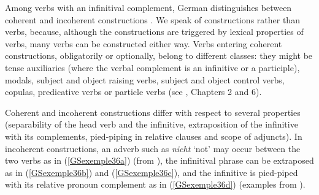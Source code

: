 {Among verbs with an infinitival complement, German distinguishes between coherent and incoherent constructions \citep{gunnar1955studien}. We speak of constructions rather than verbs, because, although the constructions are triggered by lexical properties of verbs, many verbs can be constructed either way. Verbs entering coherent constructions, obligatorily or optionally, belong to different classes: they might be tense auxiliaries (where the verbal complement is an infinitive or a participle), modals, subject and object raising verbs, subject and object control verbs, copulas, predicative verbs or particle verbs (see \citealt{Mueller2002b}, Chapters 2 and 6).

Coherent and incoherent constructions differ with respect to several properties (separability of the head verb and the infinitive, extraposition of the infinitive with its complements, pied-piping in relative clauses and scope of adjuncts). In incoherent constructions, an adverb such as \emph{nicht} `not' may occur between the two verbs as in (\ref{GSexemple36a}) (from \citealt[42]{Mueller2002b}), the infinitival phrase can be extraposed as in (\ref{GSexemple36b}) and (\ref{GSexemple36c}), and the infinitive is pied-piped with its relative pronoun complement as in (\ref{GSexemple36d}) (examples from \citealt[117--118]{HN98a}).

\eal
	\label{GSexemple36} 
	\label{GSexemple36a}

    \label{GSexemple36b}

	\label{GSexemple36c}	
		
	\label{GSexemple36d}
\zl

}
